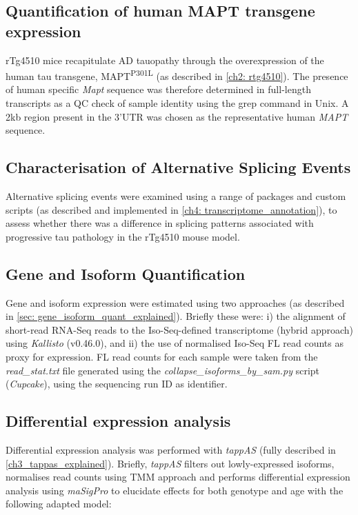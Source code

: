 \subsection{Quantification of human MAPT transgene expression}
\label{ch5: hmapt_quant}
rTg4510 mice recapitulate AD tauopathy through the overexpression of the human tau transgene, MAPT\textsuperscript{P301L} (as described in \cref{ch2: rtg4510}). The presence of human specific \textit{Mapt} sequence was therefore determined in full-length transcripts as a QC check of sample identity using the grep command in Unix. A 2kb region present in the 3'UTR was chosen as the representative human \textit{MAPT} sequence\cite{Castanho2020}.

\subsection{Characterisation of Alternative Splicing Events} 
Alternative splicing events were examined using a range of packages and custom scripts (as described and implemented in \cref{ch4: transcriptome_annotation}), to assess whether there was a difference in splicing patterns associated with progressive tau pathology in the rTg4510 mouse model. 

\subsection{Gene and Isoform Quantification}
Gene and isoform expression were estimated using two approaches (as described in \cref{sec: gene_isoform_quant_explained}). Briefly these were: i) the alignment of short-read RNA-Seq reads to the Iso-Seq-defined transcriptome (hybrid approach) using \textit{Kallisto}\cite{Bray2016} (v0.46.0), and ii) the use of normalised Iso-Seq FL read counts as proxy for expression. FL read counts for each sample were taken from the \textit{read\_stat.txt} file generated using the \textit{collapse\_isoforms\_by\_sam.py} script (\textit{Cupcake}), using the sequencing run ID as identifier. 

\subsection{Differential expression analysis}
Differential expression analysis was performed with \textit{tappAS} (fully described in \cref{ch3_tappas_explained}). Briefly, \textit{tappAS} filters out lowly-expressed isoforms, normalises read counts using TMM approach and performs differential expression analysis using \textit{maSigPro}\cite{Conesa2006,Nueda2014,Conesa2017} to elucidate effects for both genotype and age with the following adapted model\cite{Conesa2006}: 

